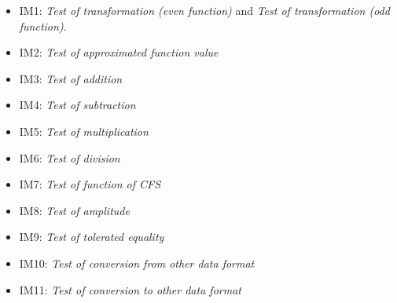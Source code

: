 \documentclass[12pt, titlepage]{article}
\begin{document}
\begin{itemize}
\item IM1: \textit{Test of transformation (even function)} and \textit{Test of
    transformation (odd function)}.
\item IM2: \textit{Test of approximated function value}
\item IM3: \textit{Test of addition}
\item IM4: \textit{Test of subtraction}
\item IM5: \textit{Test of multiplication}
\item IM6: \textit{Test of division}
\item IM7: \textit{Test of function of CFS}
\item IM8: \textit{Test of amplitude}
\item IM9: \textit{Test of tolerated equality}
\item IM10: \textit{Test of conversion from other data format}
\item IM11: \textit{Test of conversion to other data format}
\end{itemize}
				




\end{document}
